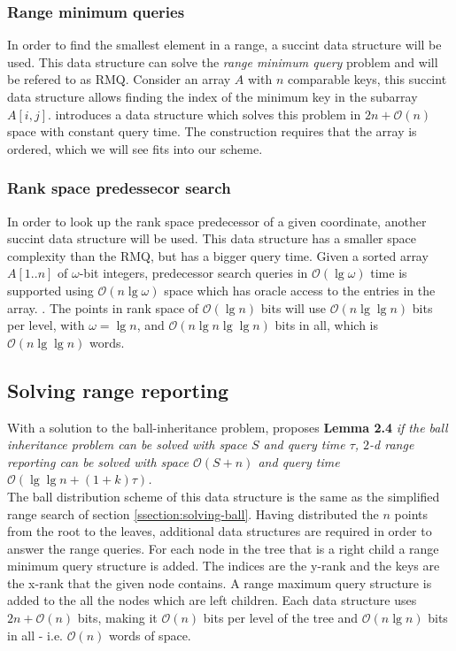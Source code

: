 \subsubsection{Range minimum queries}
In order to find the smallest element in a range, a succint data structure will be used. This data structure can solve the \emph{range minimum query} problem and will be refered to as RMQ. 
Consider an array $A$ with $n$ comparable keys, this succint data structure allows finding the index of the minimum key in the subarray $A[i,j]$. \citet{fischer} introduces a data structure which solves this problem in $2n + \mathcal{O}(n)$ space with constant query time. The construction requires that the array is ordered, which we will see fits into our scheme.

\subsubsection{Rank space predessecor search}
In order to look up the rank space predecessor of a given coordinate, another succint data structure will be used. This data structure has a smaller space complexity than the RMQ, but has a bigger query time.
Given a sorted array $A[1..n]$ of $\omega$-bit integers, predecessor search queries in $\mathcal{O}(\lg \omega)$ time is supported using $\mathcal{O}(n \lg \omega)$ space which has oracle access to the entries in the array. . The points in rank space of $\mathcal{O}(\lg n)$ bits will use $\mathcal{O}(n \lg \lg n)$ bits per level, with $\omega = \lg n$, and $\mathcal{O}(n \lg n \lg \lg n)$ bits in all, which is $\mathcal{O}(n \lg \lg n)$ words. 

\subsection{Solving range reporting}
With a solution to the ball-inheritance problem, \citet{chanetal} proposes \textbf{Lemma 2.4} \emph{if the ball inheritance problem can be solved with space $S$ and query time $\tau$, $2$-d range reporting can be solved with space $\mathcal{O}(S+n)$ and query time $\mathcal{O}(\lg \lg n + (1+k) \tau)$.} \\


The ball distribution scheme of this data structure is the same as the simplified range search of section \ref{ssection:solving-ball}. Having distributed the $n$ points from the root to the leaves, additional data structures are required in order to answer the range queries. For each node in the tree that is a right child a range minimum query structure is added. The indices are the y-rank and the keys are the x-rank that the given node contains. A range maximum query structure is added to the all the nodes which are left children. Each data structure uses $2n + \mathcal{O}(n)$ bits, making it $\mathcal{O}(n)$ bits per level of the tree and $\mathcal{O}(n \lg n)$ bits in all - i.e. $\mathcal{O}(n)$ words of space. \\

